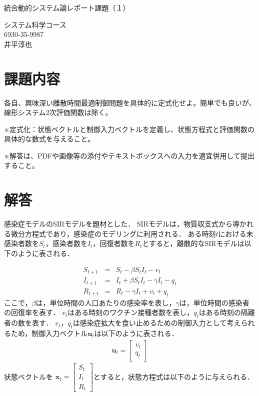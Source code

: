 \documentclass[a4j,onecolumn,10pt]{jresume}
\begin{document}
\renewcommand{\refname}{References}
\renewcommand{\abstractname}{Abstract}
%
\medskip
\begin{center}
{\Large 統合動的システム論レポート課題（１）}
\end{center}

%
\begin{flushright}
システム科学コース \\
6930-35-9987 \\
井平淳也 \\
\end{flushright}
\medskip
%



\section{課題内容}\label{sec:intro}
各自、興味深い離散時間最適制御問題を具体的に定式化せよ。簡単でも良いが、線形システム2次評価関数は除く。

※定式化：状態ベクトルと制御入力ベクトルを定義し、状態方程式と評価関数の具体的な数式を与えること。

※解答は、PDFや画像等の添付やテキストボックスへの入力を適宜併用して提出すること。

\section{解答}
感染症モデルのSIRモデルを題材とした．
SIRモデルは，物質収支式から導かれる微分方程式であり，感染症のモデリングに利用される．
ある時刻$t$における未感染者数を$S_t$，感染者数を$I_t$，回復者数を$R_t$とすると，離散的なSIRモデルは以下のように表される．

\begin{eqnarray}
    S_{t+1} &=& S_t - \beta S_tI_t -v_t\\
    I_{t+1} &=& I_t + \beta S_tI_t - \gamma I_t -q_t\\
   R_{t+1} &=& R_t - \gamma I_t +v_t + q_t
\end{eqnarray}
ここで，$\beta$は，単位時間の人口あたりの感染率を表し，$\gamma$は，単位時間の感染者の回復率を表す．
$v_t$はある時刻のワクチン接種者数を表し，$q_t$はある時刻の隔離者の数を表す．
$v_t$，$q_t$は感染症拡大を食い止めるための制御入力として考えられるため，制御入力ベクトル$\mathbf{u}_t$は以下のように表される．
\begin{eqnarray}
\mathbf{u}_t =
    \begin{bmatrix}
    v_t \\ q_t
    \end{bmatrix}
\end{eqnarray}
状態ベクトルを
$\mathbf{x}_t =
    \begin{bmatrix}
    S_t \\
    I_t \\
    R_t
    \end{bmatrix}$とすると，状態方程式は以下のように与えられる．
\end{document}

